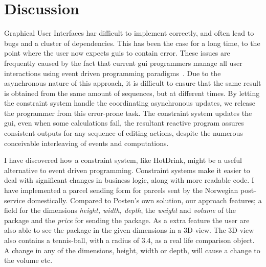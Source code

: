 \chapter{Discussion}
\label{chap:discussion}

Graphical User Interfaces har difficult to implement correctly, and often lead to bugs and a cluster of dependencies. This has been the case for a long time, to the point where the user now expects \gls{gui}s to contain error. These issues are frequently caused by the fact that current \gls{gui} programmers manage all user interactions using event driven programming paradigms~\cite{HotDrink}. Due to the asynchronous nature of this approach, it is difficult to ensure that the same result is obtained from the same amount of sequences, but at different times. By letting the constraint system handle the coordinating asynchronous updates, we release the programmer from this error-prone task. The constraint system updates the \gls{gui}, even when some calculations fail, the resultant reactive program assures consistent outputs for any sequence of editing actions, despite the numerous conceivable interleaving of events and computations.

I have discovered how a constraint system, like HotDrink, might be a useful alternative to event driven programming. Constraint systems make it easier to deal with significant changes in business logic, along with more readable code. I have implemented a parcel sending form for parcels sent by the Norwegian post-service domestically. Compared to Posten's own solution, our approach features; a field for the dimensions \textit{height, width, depth}, the \textit{weight} and \textit{volume} of the package and the \textit{price} for sending the package. As a extra feature the user are also able to see the package in the given dimensions in a 3D-view. The 3D-view also contains a tennis-ball, with a radius of 3.4, as a real life comparison object. A change in any of the dimensions, height, width or depth, will cause a change to the volume etc. 


\newpage
